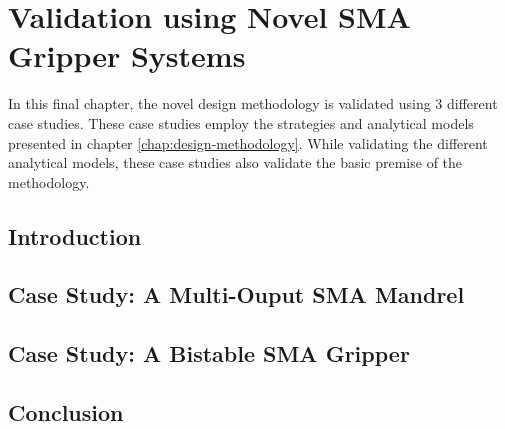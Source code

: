 
\chapter{Validation using Novel SMA Gripper Systems}\label{chap:case-study}
In this final chapter, the novel design methodology is validated using 3 different case studies. These case studies employ the strategies and analytical models presented in chapter \ref{chap:design-methodology}. While validating the different analytical models, these case studies also validate the basic premise of the methodology.
\section{Introduction}
\section{Case Study: A Multi-Ouput SMA Mandrel}\label{sec:smacm-mandrel}
\section{Case Study: A Bistable SMA Gripper}\label{sec:smabb-gripper}
\section{Conclusion}
